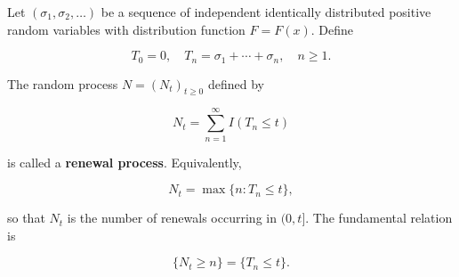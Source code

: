 Let $(\sigma_1, \sigma_2, \ldots)$ be a sequence of independent identically distributed positive random variables with distribution function $F = F(x)$. Define

$$T_0 = 0, \quad T_n = \sigma_1 + \cdots + \sigma_n, \quad n \geq 1.$$

The random process $N = (N_t)_{t \geq 0}$ defined by

$$N_t = \sum_{n=1}^{\infty} I(T_n \leq t)$$

is called a \textbf{renewal process}. Equivalently,

$$N_t = \max\{n : T_n \leq t\},$$

so that $N_t$ is the number of renewals occurring in $(0, t]$. The fundamental relation is

$$\{N_t \geq n\} = \{T_n \leq t\}.$$
